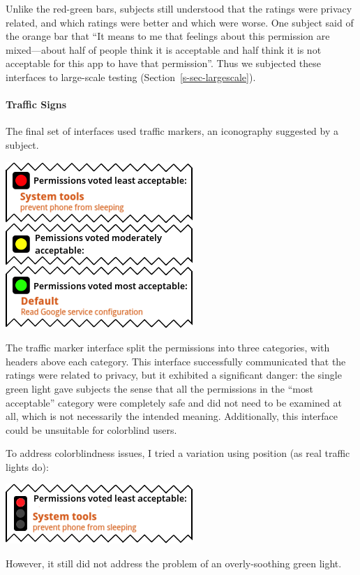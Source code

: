 \documentclass[11pt]{article}
\newcommand{\refsec}[1]{Section~\ref{#1}}
\begin{document}
Unlike the red-green
bars, subjects still understood that the ratings were privacy related, and 
which ratings were better and which were worse. One subject
said of the orange bar that ``It means to me that feelings about 
this permission are mixed---about half of people think 
it is acceptable and half think it is not 
acceptable for this app to have that permission''. Thus we
subjected these interfaces to large-scale testing (\refsec{s-sec-largescale}). 

\paragraph{Traffic Signs}
\label{s-sec-traffic}

The final set of interfaces used traffic markers, 
an iconography suggested by a subject.

\label{ss-sec-traffic-r2}
\begin{center}
\includegraphics[width=.5\linewidth]{candidate-img/traffic/trafficR2.png}
\end{center}

The traffic marker interface split the permissions into three categories, with headers above
each category.
This interface successfully communicated that the ratings were related to privacy, 
but it exhibited a significant danger: the single green light gave subjects
the sense that all the permissions in the ``most acceptable'' category were 
completely safe and did
not need to be examined at all, which is not necessarily the
intended meaning. Additionally, this interface 
could be unsuitable for colorblind users.

To address colorblindness issues, I tried a variation using position
(as real traffic lights do):
\label{ss-sec-traffic-r3}
\begin{center}
\includegraphics[width=.5\linewidth]{candidate-img/traffic/trafficR3.png}
\end{center}
However, it still did not address
the problem of an overly-soothing green light. 
\end{document}
